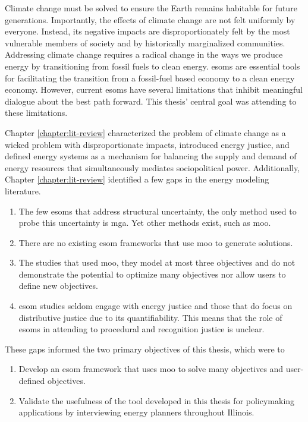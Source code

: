 Climate change must be solved to ensure the Earth remains habitable for future
generations. Importantly, the effects of climate change are not felt uniformly
by everyone. Instead, its negative impacts are disproportionately felt by the
most vulnerable members of society and by historically marginalized communities.
Addressing climate change requires a radical change in the ways we produce
energy by transitioning from fossil fuels to clean energy. \Acfp{esom} are
essential tools for facilitating the transition from a fossil-fuel based economy
to a clean energy economy. However, current \acp{esom} have several limitations
that inhibit meaningful dialogue about the best path forward. This thesis' 
central goal was attending to these limitations.

Chapter \ref{chapter:lit-review} characterized the problem of climate change as
a wicked problem with disproportionate impacts, introduced energy justice, and
defined energy systems as a mechanism for balancing the supply and demand of
energy resources that simultaneously mediates sociopolitical power.
Additionally, Chapter \ref{chapter:lit-review} identified a few gaps in the
energy modeling literature. 
\begin{enumerate}
    \item The few \acp{esom} that address structural uncertainty, the only
    method used to probe this uncertainty is \acf{mga}. Yet other methods exist,
    such as \acf{moo}.
    \item There are no existing \ac{esom} frameworks that use \ac{moo} to
    generate solutions.
    \item The studies that used \ac{moo}, they model at most three objectives
    and do not demonstrate the potential to optimize many objectives nor allow
    users to define new objectives.
    \item \ac{esom} studies seldom engage with energy justice and those that do
    focus on distributive justice due to its quantifiability. This means that
    the role of \acp{esom} in attending to procedural and recognition justice is
    unclear.
\end{enumerate}
These gaps informed the two primary objectives of this thesis, which were to
\begin{enumerate}
    \item Develop an \ac{esom} framework that uses \acl{moo} to solve many
    objectives and user-defined objectives.
    \item Validate the usefulness of the tool developed in this thesis for
    policymaking applications by interviewing energy planners throughout
    Illinois.
\end{enumerate}

